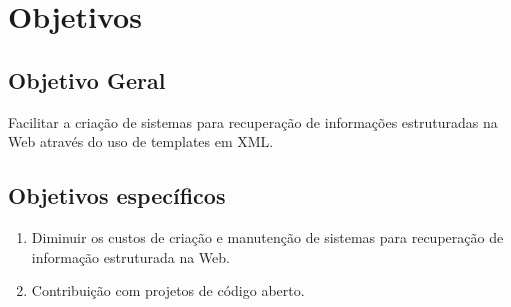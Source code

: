 \chapter{Objetivos}
\thispagestyle{fancy}

\section{Objetivo Geral}

Facilitar a criação de sistemas para recuperação de informações estruturadas na Web através do uso de templates em XML.

\section{Objetivos específicos}

\begin{enumerate}
	\item Diminuir os custos de criação e manutenção de sistemas para recuperação de informação estruturada na Web.
	\item Contribuição com projetos de código aberto.
\end{enumerate}